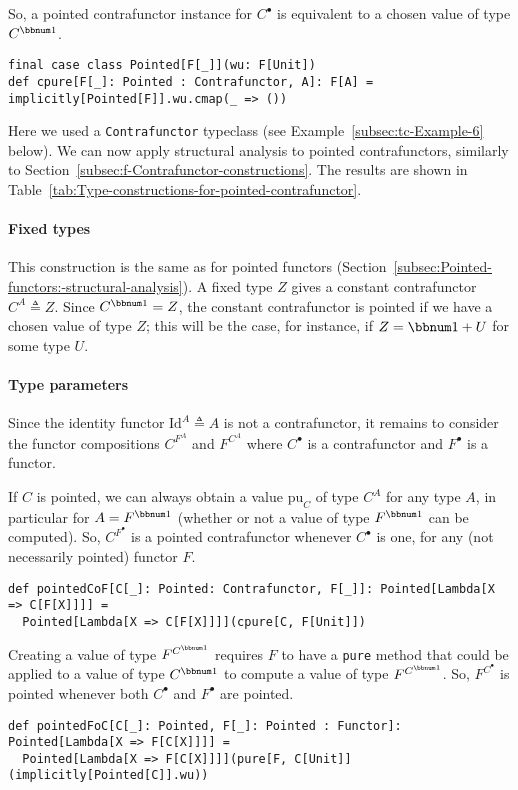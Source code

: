 So, a pointed contrafunctor instance for $C^{\bullet}$ is equivalent
to a chosen value of type $C^{\bbnum 1}$.
\begin{lstlisting}
final case class Pointed[F[_]](wu: F[Unit])
def cpure[F[_]: Pointed : Contrafunctor, A]: F[A] = implicitly[Pointed[F]].wu.cmap(_ => ())
\end{lstlisting}
Here we used a \lstinline!Contrafunctor! typeclass (see Example~\ref{subsec:tc-Example-6}
below). We can now apply structural analysis to pointed contrafunctors,
similarly to Section~\ref{subsec:f-Contrafunctor-constructions}.
The results are shown in Table~\ref{tab:Type-constructions-for-pointed-contrafunctor}.

\paragraph{Fixed types}

This construction is the same as for pointed functors (Section~\ref{subsec:Pointed-functors:-structural-analysis}).
A fixed type $Z$ gives a constant contrafunctor $C^{A}\triangleq Z$.
Since $C^{\bbnum 1}=Z$, the constant contrafunctor is pointed if
we have a chosen value of type $Z$; this will be the case, for instance,
if $Z=\bbnum 1+U$ for some type $U$. 

\paragraph{Type parameters}

Since the identity functor $\text{Id}^{A}\triangleq A$ is not a contrafunctor,
it remains to consider the functor compositions $C^{F^{A}}$ and $F^{C^{A}}$
where $C^{\bullet}$ is a contrafunctor and $F^{\bullet}$ is a functor. 

If $C$ is pointed, we can always obtain a value $\text{pu}_{C}$
of type $C^{A}$ for any type $A$, in particular for $A=F^{\bbnum 1}$
(whether or not a value of type $F^{\bbnum 1}$ can be computed).
So, $C^{F^{\bullet}}$ is a pointed contrafunctor whenever $C^{\bullet}$
is one, for any (not necessarily pointed) functor $F$.
\begin{lstlisting}
def pointedCoF[C[_]: Pointed: Contrafunctor, F[_]]: Pointed[Lambda[X => C[F[X]]]] =
  Pointed[Lambda[X => C[F[X]]]](cpure[C, F[Unit]])
\end{lstlisting}

Creating a value of type $F^{C^{\bbnum 1}}$ requires $F$ to have
a \lstinline!pure! method that could be applied to a value of type
$C^{\bbnum 1}$ to compute a value of type $F^{C^{\bbnum 1}}$. So,
$F^{C^{\bullet}}$ is pointed whenever both $C^{\bullet}$ and $F^{\bullet}$
are pointed.
\begin{lstlisting}
def pointedFoC[C[_]: Pointed, F[_]: Pointed : Functor]: Pointed[Lambda[X => F[C[X]]]] =
  Pointed[Lambda[X => F[C[X]]]](pure[F, C[Unit]](implicitly[Pointed[C]].wu))
\end{lstlisting}


